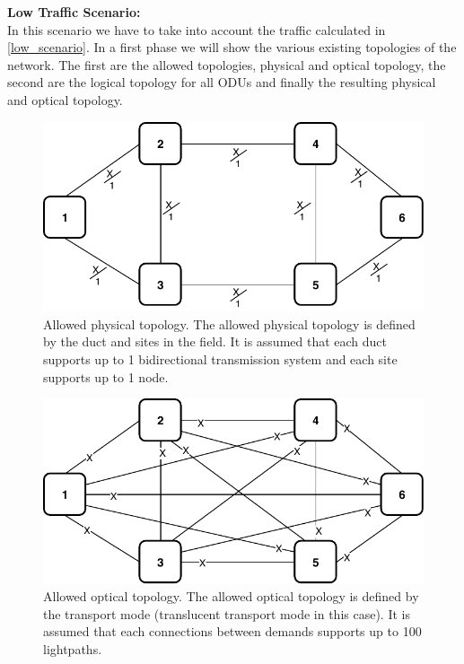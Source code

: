 \textbf{Low Traffic Scenario:}\\

In this scenario we have to take into account the traffic calculated in \ref{low_scenario}. In a first phase we will show the various existing topologies of the network. The first are the allowed topologies, physical and optical topology, the second are the logical topology for all ODUs and finally the resulting physical and optical topology.\\

\newpage
\begin{figure}[h!]
\centering
\includegraphics[width=13cm]{sdf/ilp/translucent_protection/figures/allowed_physical_topology}
\caption{Allowed physical topology. The allowed physical topology is defined by the duct and sites in the field. It is assumed that each duct supports up to 1 bidirectional transmission system and each site supports up to 1 node.}
\label{allowed3_physical_protectionlow}
\end{figure}

\vspace{20pt}
\begin{figure}[h!]
\centering
\includegraphics[width=13cm]{sdf/ilp/translucent_protection/figures/allowed_optical_topology}
\caption{Allowed optical topology. The allowed optical topology is defined by the transport mode (translucent transport mode in this case). It is assumed that each connections between demands supports up to 100 lightpaths.}
\label{allowed3_optical_protectionlow}
\end{figure}

